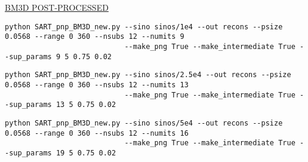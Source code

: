 \documentclass[sigconf,twocolumn,nonacm=true]{acmart}
\begin{document}
\begin{figure*}[h]
\large\begin{center}\underline{BM3D POST-PROCESSED}\end{center}\smallskip\normalsize
\begin{verbatim}
python SART_pnp_BM3D_new.py --sino sinos/1e4 --out recons --psize 0.0568 --range 0 360 --nsubs 12 --numits 9 
                            --make_png True --make_intermediate True --sup_params 9 5 0.75 0.02
\end{verbatim}\smallskip
\begin{verbatim}
python SART_pnp_BM3D_new.py --sino sinos/2.5e4 --out recons --psize 0.0568 --range 0 360 --nsubs 12 --numits 13 
                            --make_png True --make_intermediate True --sup_params 13 5 0.75 0.02
\end{verbatim}\smallskip
\begin{verbatim}
python SART_pnp_BM3D_new.py --sino sinos/5e4 --out recons --psize 0.0568 --range 0 360 --nsubs 12 --numits 16 
                            --make_png True --make_intermediate True --sup_params 19 5 0.75 0.02
\end{verbatim}
\end{figure*}
\end{document}
